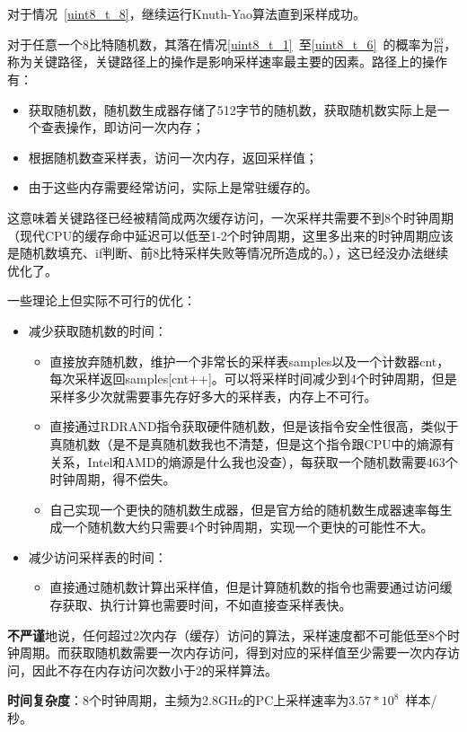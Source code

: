 \documentclass{article}
\begin{document}
	对于情况~\ref{uint8_t_8}，继续运行Knuth-Yao算法直到采样成功。
	
	对于任意一个8比特随机数，其落在情况\ref{uint8_t_1}~至\ref{uint8_t_6}~的概率为$\frac{63}{64}$，称为关键路径，关键路径上的操作是影响采样速率最主要的因素。路径上的操作有：
	\begin{itemize}
		\item 获取随机数，随机数生成器存储了512字节的随机数，获取随机数实际上是一个查表操作，即访问一次内存；
		\item 根据随机数查采样表，访问一次内存，返回采样值；
		\item 由于这些内存需要经常访问，实际上是常驻缓存的。
	\end{itemize}
	这意味着关键路径已经被精简成两次缓存访问，一次采样共需要不到8个时钟周期（现代CPU的缓存命中延迟可以低至1-2个时钟周期，这里多出来的时钟周期应该是随机数填充、if判断、前8比特采样失败等情况所造成的。），这已经没办法继续优化了。
	
	一些理论上但实际不可行的优化：
	\begin{itemize}
		\item 减少获取随机数的时间：
		\begin{itemize}
			\item 直接放弃随机数，维护一个非常长的采样表samples以及一个计数器cnt，每次采样返回samples[cnt++]。可以将采样时间减少到4个时钟周期，但是采样多少次就需要事先存好多大的采样表，内存上不可行。
			\item 直接通过RDRAND指令获取硬件随机数，但是该指令安全性很高，类似于真随机数（是不是真随机数我也不清楚，但是这个指令跟CPU中的熵源有关系，Intel和AMD的熵源是什么我也没查），每获取一个随机数需要463个时钟周期，得不偿失。
			\item 自己实现一个更快的随机数生成器，但是官方给的随机数生成器速率每生成一个随机数大约只需要4个时钟周期，实现一个更快的可能性不大。
		\end{itemize}
		\item 减少访问采样表的时间：
		\begin{itemize}
			\item 直接通过随机数计算出采样值，但是计算随机数的指令也需要通过访问缓存获取、执行计算也需要时间，不如直接查采样表快。
		\end{itemize}
	\end{itemize}
	\textbf{不严谨}地说，任何超过2次内存（缓存）访问的算法，采样速度都不可能低至8个时钟周期。而获取随机数需要一次内存访问，得到对应的采样值至少需要一次内存访问，因此不存在内存访问次数小于2的采样算法。
	
	\textbf{时间复杂度}：8个时钟周期，主频为2.8GHz的PC上采样速率为$3.57*10^8$~样本/秒。
	
\end{document}
